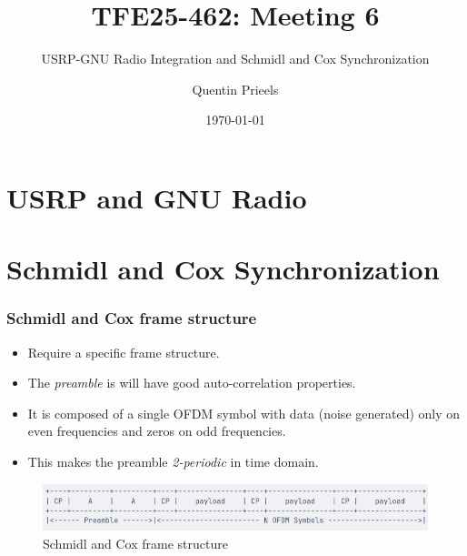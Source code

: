 \documentclass[10pt]{beamer}
\title{TFE25-462: Meeting 6}
\subtitle{USRP-GNU Radio Integration and Schmidl and Cox Synchronization}
\author{Quentin Prieels}
\date{\today}
\begin{document}
\maketitle


\section{USRP and GNU Radio}



\section{Schmidl and Cox Synchronization}

\begin{frame}
    \frametitle{Schmidl and Cox frame structure}
    \begin{itemize}
        \item Require a specific frame structure.
        \item The \textit{preamble} is will have good auto-correlation properties.
        \item It is composed of a single OFDM symbol with data (noise generated) only on even frequencies and zeros on odd frequencies.
        \item This makes the preamble \textit{2-periodic} in time domain.
    \end{itemize}
    \begin{figure}
        \centering
        \includegraphics[width=\textwidth]{frame-structure.png}
        \caption{Schmidl and Cox frame structure}
    \end{figure}
\end{frame}
\end{document}
